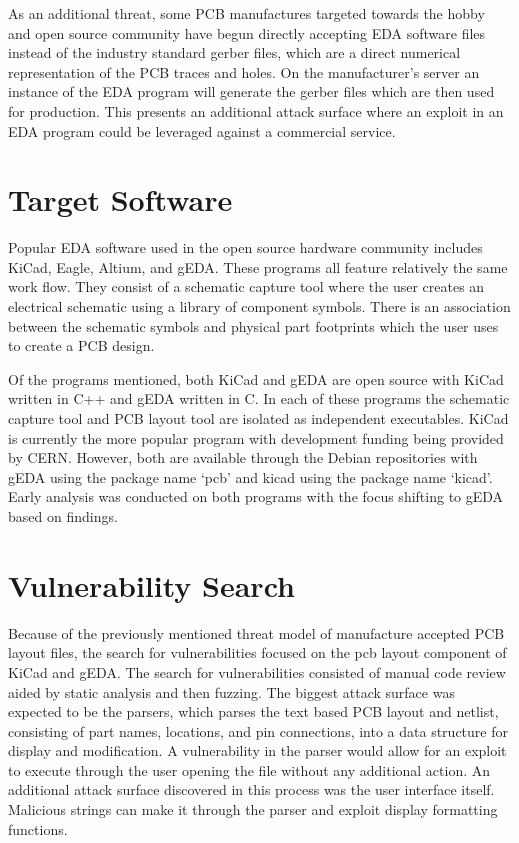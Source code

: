 \documentclass[12pt]{article}
\begin{document}
As an additional threat, some PCB manufactures targeted towards the hobby and open source community have begun directly accepting EDA software files instead of the industry standard gerber files, which are a direct numerical representation of the PCB traces and holes. On the manufacturer's server an instance of the EDA program will generate the gerber files which are then used for production. This presents an additional attack surface where an exploit in an EDA program could be leveraged against a commercial service. 


\section{Target Software}
\label{S:3}
Popular EDA software used in the open source hardware community includes KiCad, Eagle, Altium, and gEDA. These programs all feature relatively the same work flow. They consist of a schematic capture tool where the user creates an electrical schematic using a library of component symbols. There is an association between the schematic symbols and physical part footprints which the user uses to create a PCB design. 

Of the programs mentioned, both KiCad and gEDA are open source with KiCad written in C++ and gEDA written in C. In each of these programs the schematic capture tool and PCB layout tool are isolated as independent executables. KiCad is currently the more popular program with development funding being provided by CERN. However, both are available through the Debian repositories with gEDA using the package name `pcb' and kicad using the package name `kicad'. Early analysis was conducted on both programs with the focus shifting to gEDA based on findings. 


\section{Vulnerability Search}
\label{S:4}
Because of the previously mentioned threat model of manufacture accepted PCB layout files, the search for vulnerabilities focused on the pcb layout component of KiCad and gEDA. The search for vulnerabilities consisted of manual code review aided by static analysis and then fuzzing. The biggest attack surface was expected to be the parsers, which parses the text based PCB layout and netlist, consisting of part names, locations, and pin connections, into a data structure for display and modification. A vulnerability in the parser would allow for an exploit to execute through the user opening the file without any additional action. An additional attack surface discovered in this process was the user interface itself. Malicious strings can make it through the parser and exploit display formatting functions. 
\end{document}
